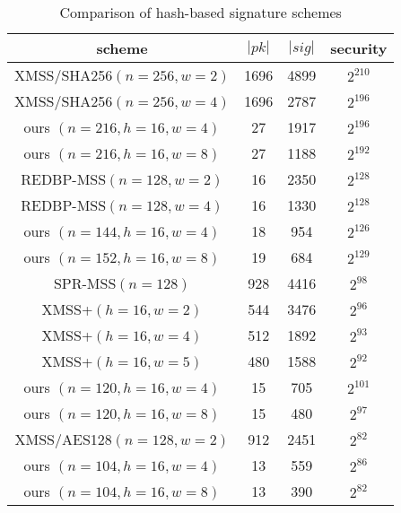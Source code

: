 \documentclass[11pt]{llncs}
\begin{document}
\begin{table}[hptb]\centering
\caption{Comparison of hash-based signature schemes}\label{tab:compare}
\begin{tabular}{cccc}\hline
scheme                   &  $|pk|$ & $|sig|$ & security\\\hline
XMSS/SHA256$(n=256,w=2)$ &   1696  &  4899   & $2^{210}$\\
XMSS/SHA256$(n=256,w=4)$ &   1696  &  2787   & $2^{196}$\\
ours $(n=216,h=16,w=4)$  &     27  &  1917   & $2^{196}$\\
ours $(n=216,h=16,w=8)$  &     27  &  1188   & $2^{192}$\\
\hline
REDBP-MSS$(n=128,w=2)$   &     16  &  2350   & $2^{128}$\\
REDBP-MSS$(n=128,w=4)$   &     16  &  1330   & $2^{128}$\\
ours $(n=144,h=16,w=4)$  &     18  &   954   & $2^{126}$\\
ours $(n=152,h=16,w=8)$  &     19  &   684   & $2^{129}$\\
\hline
SPR-MSS$(n=128)$         &    928  &  4416   & $2^{98}$\\
XMSS+$(h=16,w=2)$        &    544  &  3476   & $2^{96}$\\
XMSS+$(h=16,w=4)$        &    512  &  1892   & $2^{93}$\\
XMSS+$(h=16,w=5)$        &    480  &  1588   & $2^{92}$\\
ours $(n=120,h=16,w=4)$  &     15  &   705   & $2^{101}$\\
ours $(n=120,h=16,w=8)$  &     15  &   480   & $2^{97}$\\
\hline
XMSS/AES128$(n=128,w=2)$ &    912  &  2451   & $2^{82}$\\
ours $(n=104,h=16,w=4)$  &     13  &   559   & $2^{86}$\\
ours $(n=104,h=16,w=8)$  &     13  &   390   & $2^{82}$\\
\hline
\end{tabular}\end{table}
\end{document}
